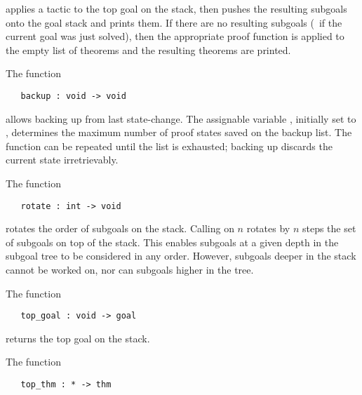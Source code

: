 \noindent applies a tactic to the top goal on the stack, then pushes the resulting
subgoals onto the goal stack and prints them. If there are no
resulting subgoals (\ie\ if the current goal was just solved), then
the appropriate proof function 
is applied to the empty list of theorems and the resulting theorems are printed.

The function

\begin{boxed}\begin{verbatim}
   backup : void -> void
\end{verbatim}\end{boxed}

\noindent allows backing up from last state-change.  The assignable variable
,
initially set to , determines the maximum number 
of proof states saved
on the backup list.  The function  can be repeated until the list is
exhausted; backing up discards the current state irretrievably.

The function

\begin{boxed}\begin{verbatim}
   rotate : int -> void
\end{verbatim}\end{boxed}

\noindent rotates the order of subgoals on the stack.  Calling
 on $n$
rotates by $n$ steps the set of subgoals on top of the 
stack.  This enables
subgoals at a given depth
in the subgoal tree to 
be considered in any order.  However, subgoals deeper in the stack
cannot be worked on, nor can subgoals higher in the tree.

The function

\begin{boxed}\begin{verbatim}
   top_goal : void -> goal
\end{verbatim}\end{boxed}

\noindent returns the top goal on the stack.

The function

\begin{boxed}\begin{verbatim}
   top_thm : * -> thm
\end{verbatim}\end{boxed}

